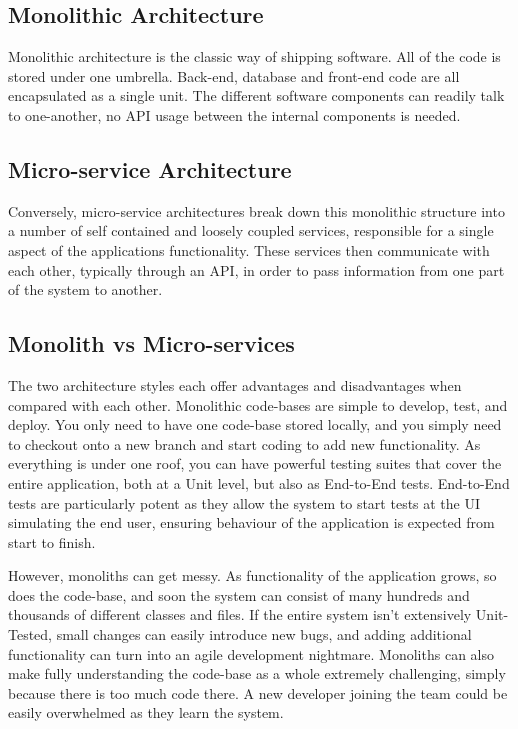 \subsection{Monolithic Architecture}
Monolithic architecture is the classic way of shipping software. All of the code is stored under one umbrella. Back-end, database and front-end code are all encapsulated as a single unit. The different software components can readily talk to one-another, no API usage between the internal components is needed. 
\subsection{Micro-service Architecture}
Conversely, micro-service architectures break down this monolithic structure into a number of self contained and loosely coupled services, responsible for a single aspect of the applications functionality. These services then communicate with each other, typically through an API, in order to pass information from one part of the system to another.
\subsection{Monolith vs Micro-services}
The two architecture styles each offer advantages and disadvantages when compared with each other. 
Monolithic code-bases are simple to develop, test, and deploy. You only need to have one code-base stored locally, and you simply need to checkout onto a new branch and start coding to add new functionality. As everything is under one roof, you can have powerful testing suites that cover the entire application, both at a Unit level, but also as End-to-End tests. End-to-End tests are particularly potent as they allow the system to start tests at the UI simulating the end user, ensuring behaviour of the application is expected from start to finish.

However, monoliths can get messy. As functionality of the application grows, so does the code-base, and soon the system can consist of many hundreds and thousands of different classes and files. If the entire system isn't extensively Unit-Tested, small changes can easily introduce new bugs, and adding additional functionality can turn into an agile development nightmare. Monoliths can also make fully understanding the code-base as a whole extremely challenging, simply because there is too much code there. A new developer joining the team could be easily overwhelmed as they learn the system. 

